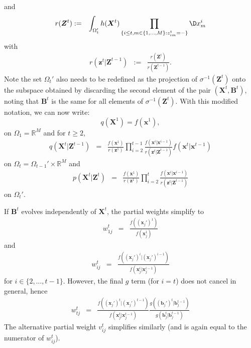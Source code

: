 \documentclass[9pt, xcolor={dvipsnames,svgnames,table}]{beamer}
\newcommand{\Real}{\mathbb R}
\begin{document}
    
    \begin{frame}
    and
        \begin{eqnarray*}
        r(\bm{Z}^t) & := & \int_{\Omega_t'}  h(\bm{X}^t) \prod_{ \{ i \leq t, m \in \{1, \ldots, M \} : z^t_{im} = - \} } \D x^i_m
    \end{eqnarray*}
    with
    \begin{eqnarray*}
        r(\bm{z}^t | \bm{Z}^{t-1}) & := & \frac{r(\bm{Z}^t)}{r(\bm{Z}^{t-1})}.
    \end{eqnarray*}
    Note the set $\Omega_t'$ also needs to be redefined as the projection of $\sigma^{-1}(\bm{Z}^t)$ onto the subspace obtained by discarding the second element of the pair $(\bm{X}^t,\bm{B}^t)$, noting that $\bm{B}^t$ is the same for all elements of $\sigma^{-1}(\bm{Z}^t)$. With this modified notation, we can now write:
    \[
        q(\bm{X}^1) = f(\bm{x}^1),
    \]
    on $\Omega_1 = \Real^M$ and for $t \geq 2$,
    \begin{eqnarray*}
        q(\bm{X}^t | \bm{Z}^{t-1}) & = & \frac{f(\bm{x}^1)}{r(\bm{z}^1)}  \prod_{i=2}^{t-1} \frac{f(\bm{x}^i | \bm{x}^{i-1}) }{r(\bm{z}^t | \bm{Z}^{t-1})} f(\bm{x}^t | \bm{x}^{t-1})
    \end{eqnarray*}
    on $\Omega_t = \Omega_{t-1}' \times \Real^M $ and 
    \begin{eqnarray*}
        p(\bm{X}^t | \bm{Z}^t) 
        & = & \frac{f(\bm{x}^1)}{r(\bm{z}^1)} \prod_{i=2}^t \frac{f(\bm{x}^i | \bm{x}^{i-1}) }{r(\bm{z}^t | \bm{Z}^{t-1})} 
    \end{eqnarray*}
    on $\Omega_t'$.
\end{frame}


\begin{frame}
    If $\bm{B}^t$ evolves independently of $\bm{X}^t$, the partial weights simplify to
    \begin{eqnarray*}
        w^{t}_{1j} &=& \frac{f((\bm{x}_j')^1)}{f(\bm{x}_j^1)}
    \end{eqnarray*}
    and
    \begin{eqnarray*}
        w^{t}_{ij} &=& \frac{f((\bm{x}_j')^i | (\bm{x}_j')^{i-1})}{f(\bm{x}_j^i | \bm{x}_j^{i-1})}
    \end{eqnarray*}
    for $i \in \{ 2, \ldots, t-1 \}$. 
    However, the final $g$ term (for $i = t$) does not cancel in general, hence
    \begin{eqnarray*}
        w^{t}_{tj} &=& \frac{f((\bm{x}_j')^t | (\bm{x}_j')^{t-1})}{f(\bm{x}_j^t | \bm{x}_j^{t-1})} \frac{g((\bm{b}_j')^t | \bm{b}_j^{t-1})}{g(\bm{b}_j^t | \bm{b}_j^{t-1})}
    \end{eqnarray*}
    The alternative partial weight $v_{ij}^t$ simplifies similarly (and is again equal to the numerator of $w_{ij}^t$).
\end{frame}
\end{document}
